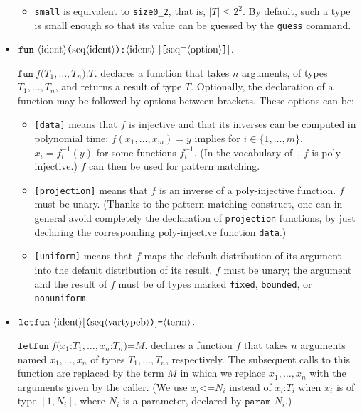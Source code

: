 \begin{itemize}
\begin{itemize}
\item \texttt{small} is equivalent to \texttt{size0\_2}, that is, $|T| \leq 2^2$.
By default, such a type is small enough so that its value can be guessed by
the \texttt{guess} command.

\end{itemize}

\item $\texttt{fun}\ \nonterm{ident}\texttt{(}\seq{ident}\texttt{):}\nonterm{ident}\ [\texttt{[}\neseq{option}\texttt{]}]\texttt{.}$

$\texttt{fun}\ f\texttt{(}T_1, \ldots, T_n\texttt{):}T\texttt{.}$ 
declares a function that takes $n$ arguments, of types $T_1, \ldots, T_n$, 
and returns a result of type $T$.
Optionally, the declaration of a function may be followed by options
between brackets. These options can be:
\begin{itemize}

\item \texttt{[data]} means that $f$ is injective and that its
inverses can be computed in polynomial time: $f(x_1, \ldots, x_m) = y$
implies for $i \in \{1, \ldots, m\}$, $x_i = f_i^{-1}(y)$ for some 
functions $f_i^{-1}$. (In the vocabulary of~\cite{BlanchetEPrint05},
$f$ is poly-injective.) $f$ can then be used for pattern matching.

\item \texttt{[projection]} means that $f$ is an inverse of a poly-injective
function. $f$ must be unary. (Thanks to the pattern matching construct, one can
in general avoid completely the declaration of \texttt{projection} functions,
by just declaring the corresponding poly-injective function \texttt{data}.)

\item \texttt{[uniform]} means that $f$ maps the default distribution
of its argument into the default distribution of its result. $f$ must be unary;
the argument and the result of $f$ must be of types marked 
{\tt fixed}, {\tt bounded}, or {\tt nonuniform}.

\end{itemize}

\item $\texttt{letfun}\
  \langle\textrm{ident}\rangle[\texttt{(}\textrm{seq}\langle\textrm{vartypeb}\rangle\texttt{)}]\texttt{=}\langle\textrm{term}\rangle\texttt{.}$ 

  $\texttt{letfun}\ f\texttt{(} x_1\texttt{:} T_1, \ldots,
  x_n\texttt{:}T_n\texttt{)=} M\texttt{.}$
  declares a function $f$ that takes $n$ arguments named
  $x_1, \ldots, x_n$ of types $T_1, \ldots, T_n$, respectively. The
  subsequent calls to this function are replaced by the term $M$ in
  which we replace $x_1, \ldots, x_n$ with the arguments given by the
  caller. (We use $x_i \texttt{<=} N_i$ instead of
  $x_i\texttt{:} T_i$ when $x_i$ is of type $[1,N_i]$, where $N_i$ is
  a parameter, declared by $\texttt{param }N_i$.)


\end{itemize}

